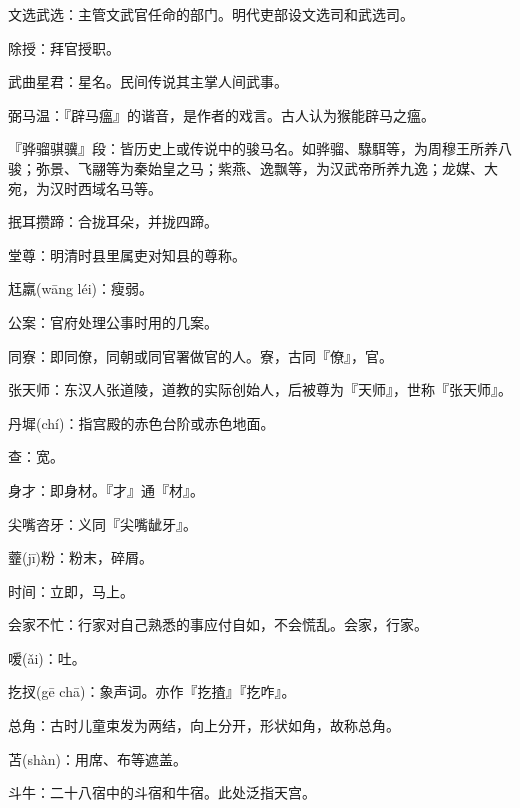 \startbuffer[198]
文选武选：主管文武官任命的部门。明代吏部设文选司和武选司。
\stopbuffer


\startbuffer[199]
除授：拜官授职。
\stopbuffer


\startbuffer[200]
武曲星君：星名。民间传说其主掌人间武事。
\stopbuffer


\startbuffer[201]
弼马温：『辟马瘟』的谐音，是作者的戏言。古人认为猴能辟马之瘟。
\stopbuffer


\startbuffer[202]
『骅骝骐骥』段：皆历史上或传说中的骏马名。如骅骝、騄駬等，为周穆王所养八骏；弥景、飞翮等为秦始皇之马；紫燕、逸飘等，为汉武帝所养九逸；龙媒、大宛，为汉时西域名马等。
\stopbuffer


\startbuffer[203]
抿耳攒蹄：合拢耳朵，并拢四蹄。
\stopbuffer


\startbuffer[204]
堂尊：明清时县里属吏对知县的尊称。
\stopbuffer


\startbuffer[205]
尪羸(wāng léi)：瘦弱。
\stopbuffer


\startbuffer[206]
公案：官府处理公事时用的几案。
\stopbuffer


\startbuffer[207]
同寮：即同僚，同朝或同官署做官的人。寮，古同『僚』，官。
\stopbuffer


\startbuffer[208]
张天师：东汉人张道陵，道教的实际创始人，后被尊为『天师』，世称『张天师』。
\stopbuffer


\startbuffer[209]
丹墀(chí)：指宫殿的赤色台阶或赤色地面。
\stopbuffer


\startbuffer[210]
查：宽。
\stopbuffer


\startbuffer[211]
身才：即身材。『才』通『材』。
\stopbuffer


\startbuffer[212]
尖嘴咨牙：义同『尖嘴龇牙』。
\stopbuffer


\startbuffer[213]
虀(jī)粉：粉末，碎屑。
\stopbuffer


\startbuffer[214]
时间：立即，马上。
\stopbuffer


\startbuffer[215]
会家不忙：行家对自己熟悉的事应付自如，不会慌乱。会家，行家。
\stopbuffer


\startbuffer[216]
嗳(ǎi)：吐。
\stopbuffer


\startbuffer[217]
扢扠(gē chā)：象声词。亦作『扢揸』『扢咋』。
\stopbuffer


\startbuffer[218]
总角：古时儿童束发为两结，向上分开，形状如角，故称总角。
\stopbuffer


\startbuffer[219]
苫(shàn)：用席、布等遮盖。
\stopbuffer


\startbuffer[220]
斗牛：二十八宿中的斗宿和牛宿。此处泛指天宫。
\stopbuffer


